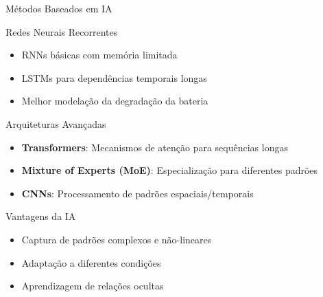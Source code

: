 \documentclass[aspectratio=169,xcolor=dvipsnames]{beamer}
\begin{document}
\begin{frame}{Métodos Baseados em IA}
  \begin{block}{Redes Neurais Recorrentes}
    \begin{itemize}
      \item RNNs básicas com memória limitada
      \item LSTMs para dependências temporais longas
      \item Melhor modelação da degradação da bateria
    \end{itemize}
  \end{block}
  
  \vspace{0.3cm}
  
  \begin{block}{Arquiteturas Avançadas}
    \begin{itemize}
      \item \textbf{Transformers}: Mecanismos de atenção para sequências longas
      \item \textbf{Mixture of Experts (MoE)}: Especialização para diferentes padrões
      \item \textbf{CNNs}: Processamento de padrões espaciais/temporais
    \end{itemize}
  \end{block}
  
  \begin{exampleblock}{Vantagens da IA}
    \begin{itemize}
      \item Captura de padrões complexos e não-lineares
      \item Adaptação a diferentes condições
      \item Aprendizagem de relações ocultas
    \end{itemize}
  \end{exampleblock}
\end{frame}
\end{document}
